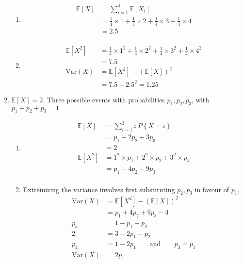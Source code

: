 \begin{enumerate}
\begin{enumerate}
			\item 	\begin{align}
				\mathbb{E}[X] &= \sum\limits_{i = 1}^{4} \mathbb{E}[X_i] \nonumber \\
				&= \frac{1}{4} \times 1 + \frac{1}{4} \times 2 + \frac{1}{4} \times 3 + \frac{1}{4} \times 4 \nonumber \\
				&= 2.5   \\
			\end{align}
			
			\item 	\begin{align}
				\mathbb{E}[X^2] &= \frac{1}{4} \times 1^2 + \frac{1}{4} \times 2^2 + \frac{1}{4} \times 3^2 + \frac{1}{4} \times 4^2 \nonumber \\
				&= 7.5 \\
				\mathrm{Var}(X) &= \mathbb{E}[X^2] - (\mathbb{E}[X])^2 \nonumber \\
				&= 7.5 - 2.5^2 = 1.25
			\end{align}
			
		\end{enumerate}
	
	
	
	\item $\mathbb{E}[X] = 2 $. Three possible events with probabilities $ p_1, p_2, p_3 $, with $ p_1 + p_2 + p_3  = 1$\\
	
		\begin{enumerate}
			
			\item 	\begin{align}
				\mathbb{E}[X] &= \sum\limits_{i = 1}^{3} i\ P\left\{X = i\right\} \nonumber \\
				&= p_1 + 2p_2 + 3p_3 \nonumber \\
				&= 2   \\
				\mathbb{E}[X^2] &= 1^2 \times p_1 + 2^2 \times p_2 + 3^2 \times p_3 \nonumber \\
				&= p_1 + 4 p_2 + 9 p_3 \nonumber \\
			\end{align}
			
			\item Extremizing the variance involves first substituting $ p_2, p_3 $ in favour of $ p_1 $,
			\begin{align}
				\mathrm{Var}(X) &= \mathbb{E}[X^2] - (\mathbb{E}[X])^2 \nonumber \\
				&= p_1 + 4 p_2 + 9 p_3 - 4 \nonumber \\
				p_3 &= 1 - p_1 - p_2 \nonumber \\
				2 &= 3 -2p_1 - p_2 \nonumber \\
				p_2 &= 1 - 2p_1 \qquad \text{and} \qquad p_3 = p_1 \\
				\mathrm{Var}(X) &= 2p_1
			\end{align}
			

\end{enumerate}
\end{enumerate}

